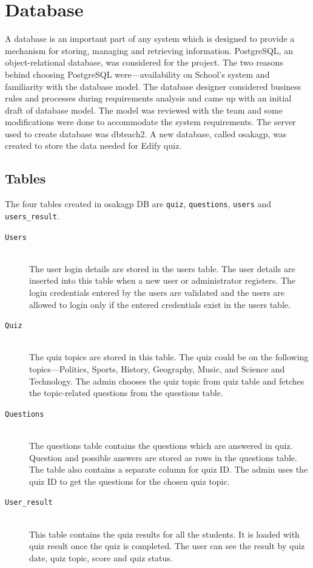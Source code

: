 \section{Database}
\label{sec:database}

A database is an important part of any system which is designed to provide a
mechanism for storing, managing and retrieving information.  PostgreSQL, an
object-relational database, was considered for the project. The two reasons
behind choosing PostgreSQL were---availability on School's system and
familiarity with the database model. The database designer considered business
rules and processes during requirements analysis and came up with an initial
draft of database model. The model was reviewed with the team and some
modifications were done to accommodate the system requirements. The server used
to create database was dbteach2. A new database, called osakagp, was created to
store the data needed for Edify quiz.

\subsection{Tables}
\label{sub:tables}

The four tables created in osakagp DB are \verb+quiz+, \verb+questions+,
\verb+users+ and \verb+users_result+.

\begin{description}

	\item[\texttt{Users}] \hfill \\ The user login details are stored in the
		users table. The user details are inserted into this table when a new
		user or administrator registers. The login credentials entered by the
		users are validated and the users are allowed to login only if the
		entered credentials exist in the users table.

	\item[\texttt{Quiz}] \hfill \\ The quiz topics are stored in this table.
		The quiz could be on the following topics---Politics, Sports, History,
		Geography, Music, and Science and Technology. The admin chooses the
		quiz topic from quiz table and fetches the topic-related questions from
		the questions table.

	\item[\texttt{Questions}] \hfill \\ The questions table contains the
		questions which are answered in quiz.  Question and possible answers
		are stored as rows in the questions table.  The table also contains a
		separate column for quiz ID\@. The admin uses the quiz ID to get the
		questions for the chosen quiz topic.

	\item[\texttt{User\_result}] \hfill \\ This table contains the quiz results
		for all the students. It is loaded with quiz result once the quiz is
		completed. The user can see the result by quiz date, quiz topic, score
		and quiz status.

\end{description}

